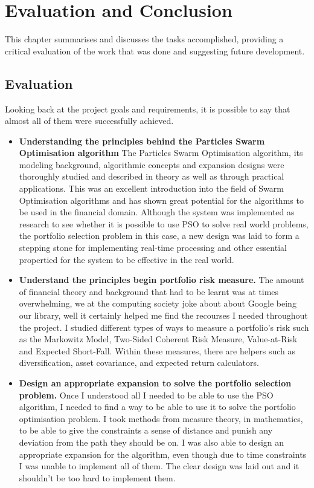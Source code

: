 \chapter{Evaluation and Conclusion}
This chapter summarises and discusses the tasks accomplished, providing a critical evaluation of the work that was done and suggesting future development.

  \section{Evaluation} %
  \label{sec:evaluation}
  Looking back at the project goals and requirements, it is possible to say that almost all of them were successfully achieved. 
  \begin{itemize}
    \item \textbf{Understanding the principles behind the Particles Swarm Optimisation algorithm} The Particles Swarm Optimisation algorithm, its modeling background, algorithmic concepts and expansion designs were thoroughly studied and described in theory as well as through practical applications. This was an excellent introduction into the field of Swarm Optimisation algorithms and has shown great potential for the algorithms to be used in the financial domain. Although the system was implemented as research to see whether it is possible to use PSO to solve real world problems, the portfolio selection problem in this case, a new design was laid to form a stepping stone for implementing real-time processing and other essential propertied for the system to be effective in the real world.
    \item \textbf{Understand the principles begin portfolio risk measure.} The amount of financial theory and background that had to be learnt was at times overwhelming, we at the computing society joke about about Google being our library, well  it certainly helped me find the recourses I needed throughout the project. I studied different types of ways to measure a portfolio's risk such as the Markowitz Model, Two-Sided Coherent Risk Measure, Value-at-Risk and Expected Short-Fall. Within these measures, there are helpers such as diversification, asset covariance, and expected return calculators. 
    \item \textbf{Design an appropriate expansion to solve the portfolio selection problem.} Once I understood all I needed to be able to use the PSO algorithm, I needed to find a way to be able to use it to solve the portfolio optimisation problem. I took methods from measure theory, in mathematics, to be able to give the constraints a sense of distance and punish any deviation from the path they should be on. I was also able to design an appropriate expansion for the algorithm, even though due to time constraints I was unable to implement all of them. The clear design was laid out and it shouldn't be too hard to implement them.

\end{itemize}
